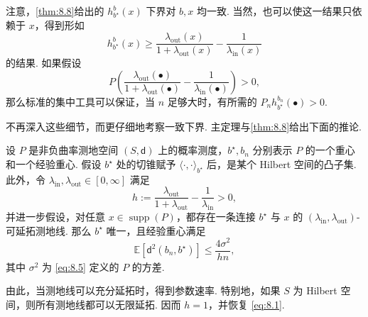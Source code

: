 注意，\autoref{thm:8.8}给出的 $h_{b^\star}^b(x)$ 下界对 $b,x$ 均一致. 当然，也可以使这一结果只依赖于 $x$，得到形如
$$h_{b^\star}^b(x)\ge\frac{\lambda_{\mathrm{out}}(x)}{1+\lambda_{\mathrm{out}}(x)}
-\frac1{\lambda_{\mathrm{in}}(x)}$$
的结果. 如果假设
$$P\left(\frac{\lambda_{\mathrm{out}}(\bullet)}{1+\lambda_{\mathrm{out}}(\bullet)}
-\frac1{\lambda_{\mathrm{in}}(\bullet)}\right)>0,$$
那么标准的集中工具可以保证，当 $n$ 足够大时，有所需的 $P_nh_{b^\star}^{b_n}(\bullet)>0$.

不再深入这些细节，而更仔细地考察一致下界. 主定理与\autoref{thm:8.8}给出下面的推论.
\begin{corollary}\label{cor:8.9}
设 $P$ 是非负曲率测地空间 $(S,\mathsf d)$ 上的概率测度，$b^\star,b_n$ 分别表示 $P$ 的一个重心和一个经验重心. 假设 $b^\star$ 处的切锥赋予 $\langle\cdot,\cdot\rangle_{b^\star}$ 后，是某个 Hilbert 空间的凸子集. 此外，令 $\lambda_{\mathrm{in}},\lambda_{\mathrm{out}}\in[0,\infty]$ 满足
$$h:=\frac{\lambda_{\mathrm{out}}}{1+\lambda_{\mathrm{out}}}-\frac1{\lambda_{\mathrm{in}}}>0,$$
并进一步假设，对任意 $x\in\operatorname{supp}(P)$，都存在一条连接 $b^\star$ 与 $x$ 的 $(\lambda_{\mathrm{in}},\lambda_{\mathrm{out}})$-可延拓测地线. 那么 $b^\star$ 唯一，且经验重心满足
$$\mathbb E[\mathsf d^2(b_n,b^\star)]\le\frac{4\sigma^2}{hn},$$
其中 $\sigma^2$ 为 \eqref{eq:8.5} 定义的 $P$ 的方差.
\end{corollary}
由此，当测地线可以充分延拓时，得到参数速率. 特别地，如果 $S$ 为 Hilbert 空间，则所有测地线都可以无限延拓. 因而 $h=1$，并恢复 \eqref{eq:8.1}.
